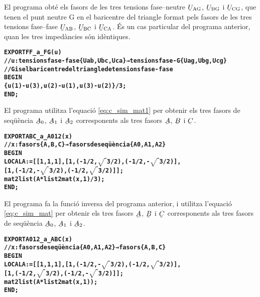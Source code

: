 El programa  obté els fasors de les tres tensions fase--neutre $\cmplx{U}\ped{AG}$, $\cmplx{U}\ped{BG}$ i $\cmplx{U}\ped{CG}$, que tenen el punt neutre G en el baricentre del triangle format pels fasors de  les tres tensions fase--fase
$\cmplx{U}\ped{AB}$, $\cmplx{U}\ped{BC}$ i $\cmplx{U}\ped{CA}$. És un cas particular del programa anterior, quan les tres impedàncies són idèntiques.
\vspace{-6mm}
\begin{alltt}
\bfseries
{}
    EXPORT FF_a_FG(u)
    // u:tensions fase-fase \{Uab,Ubc,Uca\} → tensions fase-G \{Uag,Ubg,Ucg\}
    // G is el baricentre del triangle de tensions fase-fase
    BEGIN
      \{u(1)-u(3),u(2)-u(1),u(3)-u(2)\}/3;
    END;
\end{alltt}

El programa  utilitza l'equació \eqref{eq:c_sim_mat1} per obtenir els tres fasors de seqüència
$\cmplx{A}_0$, $\cmplx{A}_1$ i  $\cmplx{A}_2$ corresponents als tres fasors $\cmplx{A}$, $\cmplx{B}$ i $\cmplx{C}$.
\vspace{-6mm}
\begin{alltt}
\bfseries
{}
    EXPORT ABC_a_A012(x)
    // x:fasors \{A,B,C\} → fasors de seqüència \{A0,A1,A2\}
    BEGIN
      LOCAL A:=[[1,1,1],[1,(-1/2,\(\sqrt{\phantom{|}}\)3/2),(-1/2,-\(\sqrt{\phantom{|}}\)3/2)],
                [1,(-1/2,-\(\sqrt{\phantom{|}}\)3/2),(-1/2,\(\sqrt{\phantom{|}}\)3/2)]];
      mat2list(A*list2mat(x,1)/3);
    END;
\end{alltt}

El programa  fa la funció inversa del programa anterior, i utilitza l'equació \eqref{eq:c_sim_mat} per obtenir els tres fasors
$\cmplx{A}$, $\cmplx{B}$ i $\cmplx{C}$  corresponents als tres fasors de seqüència
$\cmplx{A}_0$, $\cmplx{A}_1$ i  $\cmplx{A}_2$.
\vspace{-6mm}
\begin{alltt}
\bfseries
{}
    EXPORT A012_a_ABC(x)
    // x:fasors de seqüència \{A0,A1,A2\} → fasors \{A,B,C\}
    BEGIN
      LOCAL A:=[[1,1,1],[1,(-1/2,-\(\sqrt{\phantom{|}}\)3/2),(-1/2,\(\sqrt{\phantom{|}}\)3/2)],
                [1,(-1/2,\(\sqrt{\phantom{|}}\)3/2),(-1/2,-\(\sqrt{\phantom{|}}\)3/2)]];
      mat2list(A*list2mat(x,1));
    END;
\end{alltt}

